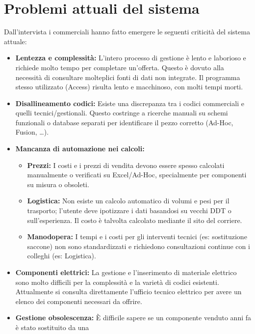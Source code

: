 \section{Problemi attuali del sistema}
Dall'intervista i commerciali hanno fatto emergere le seguenti criticità del sistema attuale:
\begin{itemize}
      \item \textbf{Lentezza e complessità:} L'intero processo di gestione è lento e laborioso
            e richiede molto tempo per completare un'offerta. Questo è dovuto alla necessità di consultare molteplici fonti di
            dati non integrate. Il programma stesso utilizzato (Access) risulta lento e macchinoso, con molti tempi morti.
      \item \textbf{Disallineamento codici:} Esiste una discrepanza tra i codici commerciali e quelli tecnici/gestionali.
            Questo costringe a ricerche manuali su schemi funzionali o database separati per identificare il pezzo corretto (Ad-Hoc, Fusion, \dots).
      \item \textbf{Mancanza di automazione nei calcoli:}
            \begin{itemize}
                  \item \textbf{Prezzi:} I costi e i prezzi di vendita devono essere spesso calcolati manualmente o verificati
                        su Excel/Ad-Hoc, specialmente per componenti su misura o obsoleti.
                  \item \textbf{Logistica:} Non esiste un calcolo automatico di volumi e pesi per il trasporto; l'utente deve
                        ipotizzare i dati basandosi su vecchi DDT o sull'esperienza. Il costo è talvolta calcolato mediante il sito del corriere.
                  \item \textbf{Manodopera:} I tempi e i costi per gli interventi tecnici (es: sostituzione saccone) non sono
                        standardizzati e richiedono consultazioni continue con i colleghi (es: Logistica).
            \end{itemize}
      \item \textbf{Componenti elettrici:} La gestione e l'inserimento di materiale elettrico sono molto difficili per la 
      complessità e la varietà di codici esistenti. Attualmente si consulta direttamente l'ufficio tecnico elettrico per
            avere un elenco dei componenti necessari da offrire.
      \item \textbf{Gestione obsolescenza:} È difficile sapere se un componente venduto anni fa è stato sostituito da una

\end{itemize}
